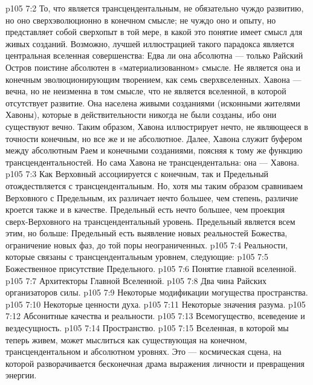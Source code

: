 \vs p105 7:2 То, что является трансцендентальным, не обязательно чуждо развитию, но оно сверхэволюционно в конечном смысле; не чуждо оно и опыту, но представляет собой сверхопыт в той мере, в какой это понятие имеет смысл для живых созданий. Возможно, лучшей иллюстрацией такого парадокса является центральная вселенная совершенства: Едва ли она абсолютна --- только Райский Остров поистине абсолютен в «материализованном» смысле. Не является она и конечным эволюционирующим творением, как семь сверхвселенных. Хавона --- вечна, но не неизменна в том смысле, что не является вселенной, в которой отсутствует развитие. Она населена живыми созданиями (исконными жителями Хавоны), которые в действительности никогда не были созданы, ибо они существуют вечно. Таким образом, Хавона иллюстрирует нечто, не являющееся в точности конечным, но все же и не абсолютное. Далее, Хавона служит буфером между абсолютным Раем и конечными созданиями, поясняя к тому же функцию трансцендентальностей. Но сама Хавона не трансцендентальна: она --- Хавона.
\vs p105 7:3 Как Верховный ассоциируется с конечным, так и Предельный отождествляется с трансцендентальным. Но, хотя мы таким образом сравниваем Верховного с Предельным, их различает нечто большее, чем степень, различие кроется также и в качестве. Предельный есть нечто большее, чем проекция сверх\hyp{}Верховного на трансцендентальный уровень. Предельный является всем этим, но больше: Предельный есть выявление новых реальностей Божества, ограничение новых фаз, до той поры неограниченных.
\vs p105 7:4 \pc Реальности, которые связаны с трансцендентальным уровнем, следующие:
\vs p105 7:5 \bibnobreakspace Божественное присутствие Предельного.
\vs p105 7:6 \bibnobreakspace Понятие главной вселенной.
\vs p105 7:7 \bibnobreakspace Архитекторы Главной Вселенной.
\vs p105 7:8 \bibnobreakspace Два чина Райских организаторов силы.
\vs p105 7:9 \bibnobreakspace Некоторые модификации могущества пространства.
\vs p105 7:10 \bibnobreakspace Некоторые ценности духа.
\vs p105 7:11 \bibnobreakspace Некоторые значения разума.
\vs p105 7:12 \bibnobreakspace Абсонитные качества и реальности.
\vs p105 7:13 \bibnobreakspace Всемогущество, всеведение и вездесущность.
\vs p105 7:14 \bibnobreakspace Пространство.
\vs p105 7:15 \pc Вселенная, в которой мы теперь живем, может мыслиться как существующая на конечном, трансцендентальном и абсолютном уровнях. Это --- космическая сцена, на которой разворачивается бесконечная драма выражения личности и превращения энергии.
